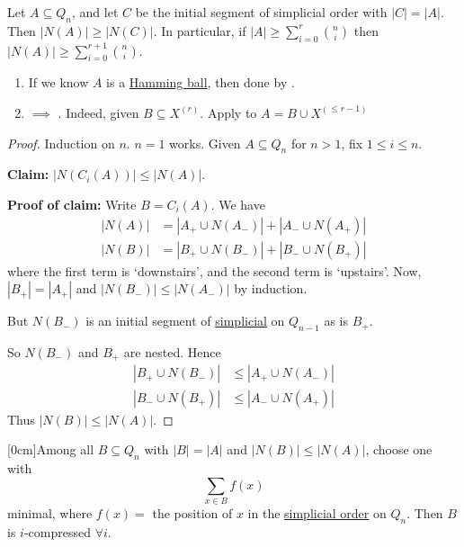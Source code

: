 \documentclass{article}
\let\subset\subseteq
\begin{document}
\begin{nthm}\label{thm:harper1}
  Let $A \subset Q_n$, and let $C$ be the initial segment of simplicial order with $|C| = |A|$.
  Then $|N(A)| \geq |N(C)|$. In particular, if $|A| \geq \sum_{i=0}^r \binom{n}{i}$ then $|N(A)| \geq \sum_{i=0}^{r+1} \binom{n}{i}$.
\end{nthm}
\begin{remark}\leavevmode
  \begin{enumerate}[label=\arabic*.]
    \item If we know $A$ is a \hyperlink{def:hamming}{Hamming ball}, then done by .
    \item {} $\implies$ . Indeed, given $B \subset X^{(r)}$.
      Apply  to $A = B \cup X^{(\leq r-1)}$
  \end{enumerate}
\end{remark}
\begin{proof}
  Induction on $n$. $n=1$ works.
  Given $A \subset Q_n$ for $n > 1$, fix $1 \leq i \leq n$.

  \textbf{Claim:} $|N(C_i(A))| \leq |N(A)|$.

  \textbf{Proof of claim:} Write $B = C_i(A)$.
  We have
  \begin{align*}
    |N(A)| &= |A_+ \cup N(A_-)| + |A_- \cup N(A_+)| \\
    |N(B)| &= |B_+ \cup N(B_-)| + |B_- \cup N(B_+)|
  \end{align*}
  where the first term is `downstairs', and the second term is `upstairs'.
  Now, $|B_+| = |A_+|$ and $|N(B_-)| \leq |N(A_-)|$ by induction.

  But $N(B_-)$ is an initial segment of \hyperlink{def:simplicial}{simplicial} on $Q_{n-1}$ as is $B_+$.

  So $N(B_-)$ and $B_+$ are nested.
  Hence
  \begin{align*}
    |B_+ \cup N(B_-)| &\leq |A_+ \cup N(A_-)| \\
    |B_- \cup N(B_+)| &\leq |A_- \cup N(A_+)|
  \end{align*}
  Thus $|N(B)| \leq |N(A)|$.
\end{proof}
[0cm]Among all $B \subset Q_n$ with $|B| = |A|$ and $|N(B)| \leq |N(A)|$, choose one with
\begin{equation*}
  \sum_{x \in B} f(x)
\end{equation*}
minimal, where $f(x)=$ the position of $x$ in the \hyperlink{def:simplicial}{simplicial order} on $Q_n$.
Then $B$ is $i$-compressed $\forall i$.
\end{document}
